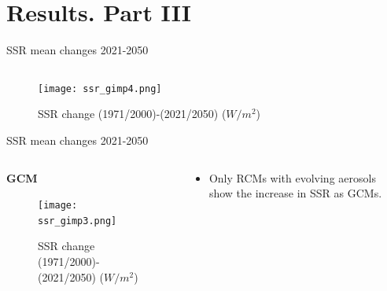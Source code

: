 \documentclass{beamer}%
\begin{document}
\section{Results. Part III}
 
\begin{frame}[fragile]{SSR mean changes 2021-2050}
\vspace{1\baselineskip}
\begin{columns}
  \begin{column}{0.45\textwidth}
      \end{column}
      \begin{column}{0.7\textwidth}
   \end{column}
   \end{columns}
    \begin{figure}
      \texttt{[image: ssr\_gimp4.png]}
        \centering\caption{SSR change (1971/2000)-(2021/2050) ($W/m^2$)}
      \end{figure}
\end{frame}

\begin{frame}[fragile]{SSR mean changes 2021-2050}
\vspace{0.5\baselineskip}
\begin{columns}
  \begin{column}{0.7\textwidth}
 \hspace{1.8\baselineskip}\LARGE{\textbf{GCM}}
    \begin{figure}
      \texttt{[image: ssr\_gimp3.png]}
        \centering\caption{SSR change (1971/2000)-(2021/2050) ($W/m^2$)}
    \end{figure}
  \end{column}
  \begin{column}{0.4\textwidth}
    \begin{itemize}
      \centering\item Only RCMs with evolving aerosols show the increase in SSR as GCMs.
    \end{itemize}
  \end{column}
  \end{columns}
\end{frame}
 
\end{document}
